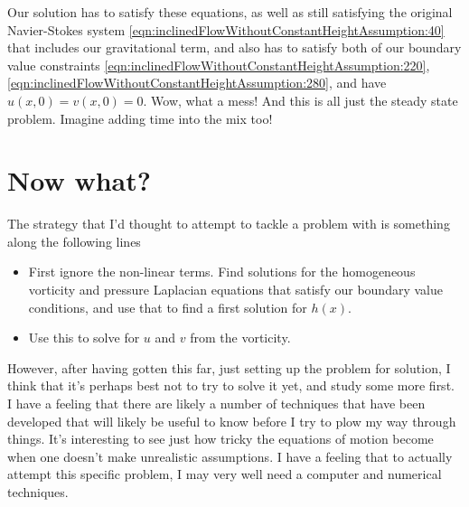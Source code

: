 Our solution has to satisfy these equations, as well as still satisfying the original Navier-Stokes system \ref{eqn:inclinedFlowWithoutConstantHeightAssumption:40} that includes our gravitational term, and also has to satisfy both of our boundary value constraints \ref{eqn:inclinedFlowWithoutConstantHeightAssumption:220}, \ref{eqn:inclinedFlowWithoutConstantHeightAssumption:280}, and have $u(x, 0) = v(x, 0) = 0$.  Wow, what a mess!  And this is all just the steady state problem.  Imagine adding time into the mix too!

\section{Now what?}

The strategy that I'd thought to attempt to tackle a problem with is something along the following lines

\begin{itemize}
\item First ignore the non-linear terms.  Find solutions for the homogeneous vorticity and pressure Laplacian equations that satisfy our boundary value conditions, and use that to find a first solution for $h(x)$.
\item Use this to solve for $u$ and $v$ from the vorticity.
\end{itemize}

However, after having gotten this far, just setting up the problem for solution, I think that it's perhaps best not to try to solve it yet, and study some more first.  I have a feeling that there are likely a number of techniques that have been developed that will likely be useful to know before I try to plow my way through things.  It's interesting to see just how tricky the equations of motion become when one doesn't make unrealistic assumptions.  I have a feeling that to actually attempt this specific problem, I may very well need a computer and numerical techniques.

\EndNoBibArticle
